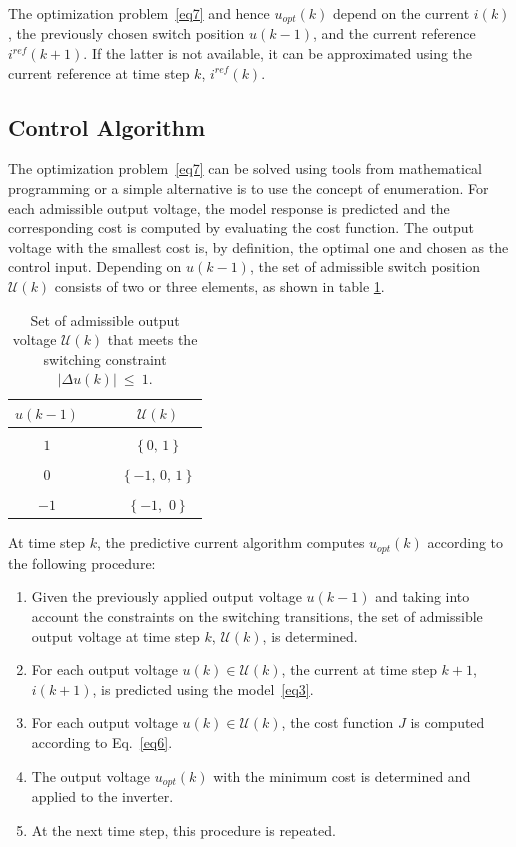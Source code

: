 \documentclass[11pt,a4paper,oneside]{book}
\numberwithin{equation}{section}
\newcommand{\abs}[1]{\big|#1\big|}
\theoremstyle{it}
\theoremstyle{definition}
\begin{document}
The optimization problem~\ref{eq7} and hence $u_{opt}(k)$ depend on the current 
$i(k)$, the previously chosen switch position $u(k-1)$, and the current 
reference $i^{ref}(k+1)$. If the latter is not available, it can be 
approximated using the current reference at time step $k$, $i^{ref}(k)$.
\subsection{Control Algorithm} 
The optimization problem~\ref{eq7} can be solved using tools from mathematical 
programming or a simple alternative is to use the concept of enumeration. For 
each admissible output voltage, the model response is predicted and the 
corresponding cost is computed by evaluating the cost function. The output 
voltage with the smallest cost is, by definition, the optimal one and chosen as 
the control input. Depending on $u(k-1)$, the set of admissible switch position 
$\mathcal{U}(k)$ consists of two or three elements, as shown in table 
\ref{tepm}.
\begin{table}[H]
	\begin{center}
		\begin{tabular}{c|c}
			$u(k-1)\quad$ & $\quad \mathcal{U}(k)$ \\[6pt]
			\hline \\
			$1\quad$ 	& $\quad \left\lbrace 0,\,1\right\rbrace$ \\ \\
			$0\quad$ 	& $\quad \left\lbrace -1,\,0,\,1\right\rbrace$ \\ \\
			$-1\quad$	& $\quad \left\lbrace -1, \,\,0\right\rbrace$ \\
		\end{tabular}
	\end{center}
	\captionsetup{width=.5\textwidth}
	\caption{Set of admissible output voltage $\mathcal{U}(k)$ that meets the 
	switching constraint $\abs{\Delta u(k)}~\le~1$.}
	\label{tepm}
\end{table}
At time step $k$, the predictive current algorithm computes $u_{opt}(k)$ 
according to the following procedure:
\begin{enumerate}
	\item Given the previously applied output voltage $u(k-1)$ and taking into 
	account the constraints on the switching transitions, the set of admissible 
	output voltage at time step $k$, $\mathcal{U}(k)$, is determined.
	\item For each output voltage $u(k) \in \mathcal{U}(k)$, the current at 
	time step $k+1$, $i(k+1)$, is predicted using the model~\ref{eq3}.
	\item For each output voltage $u(k) \in \mathcal{U}(k)$, the cost function 
	$J$ is computed according to Eq.~\eqref{eq6}.
	\item The output voltage $u_{opt}(k)$ with the minimum cost is determined 
	and applied to the inverter.
	\item At the next time step, this procedure is repeated.
\end{enumerate}
\end{document}
